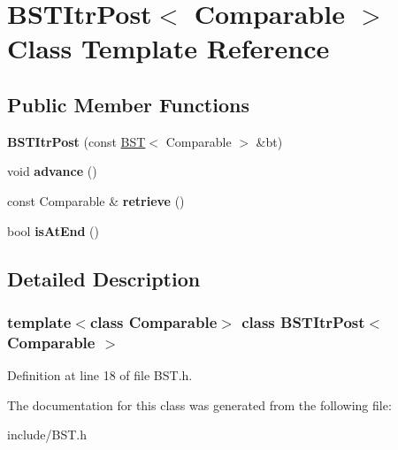 \hypertarget{classBSTItrPost}{}\section{B\+S\+T\+Itr\+Post$<$ Comparable $>$ Class Template Reference}
\label{classBSTItrPost}
\subsection*{Public Member Functions}
\begin{DoxyCompactItemize}
\item 
\mbox{\label{classBSTItrPost_acf7e537dea01978f40c40909c55c56c2}} 
{\bfseries B\+S\+T\+Itr\+Post} (const \hyperlink{classBST}{B\+ST}$<$ Comparable $>$ \&bt)
\item 
\mbox{\label{classBSTItrPost_a376098e5a82cd02118dd4dcdec49bb26}} 
void {\bfseries advance} ()
\item 
\mbox{\label{classBSTItrPost_a1e9f3953f7ae5712bf3c7c6d05059718}} 
const Comparable \& {\bfseries retrieve} ()
\item 
\mbox{\label{classBSTItrPost_a2f330e73bb817e8bd1c797805e66ddb7}} 
bool {\bfseries is\+At\+End} ()
\end{DoxyCompactItemize}


\subsection{Detailed Description}
\subsubsection*{template$<$class Comparable$>$\newline
class B\+S\+T\+Itr\+Post$<$ Comparable $>$}



Definition at line 18 of file B\+S\+T.\+h.



The documentation for this class was generated from the following file\+:\begin{DoxyCompactItemize}
\item 
include/B\+S\+T.\+h\end{DoxyCompactItemize}
